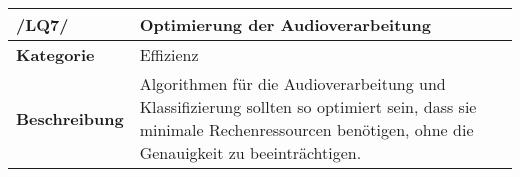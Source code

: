 \begin{table}[h!]
	\begin{tabularx}{\textwidth}{|l|X|}
		\hline
		\textbf{/LQ7/} & \textbf{Optimierung der Audioverarbeitung} \\ \hline
		\textbf{Kategorie} & Effizienz \\ \hline
		\textbf{Beschreibung} & Algorithmen für die Audioverarbeitung und Klassifizierung sollten so optimiert sein, dass sie minimale Rechenressourcen benötigen, ohne die Genauigkeit zu beeinträchtigen. \\ \hline
	\end{tabularx}
\end{table}